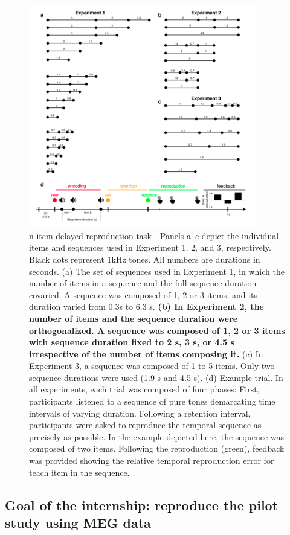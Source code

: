 \begin{figure}[ht]
    \centering
    \includegraphics[width=10cm]{images_report/n-item delayed reproduction task.png}
    \caption[n-item delayed reproduction task]%
    {n-item delayed reproduction task - Panels a–c depict the individual items and sequences used in Experiment 1, 2, and 3, respectively. Black dots represent 1kHz tones. All numbers are durations in seconds. (a) The set of sequences used in Experiment 1, in which the number of items in a sequence and the full sequence duration covaried. A sequence was composed of 1, 2 or 3 items, and its duration varied from 0.3s to 6.3 s. \textbf{(b) In Experiment 2, the number of items and the sequence duration were orthogonalized. A sequence was composed of 1, 2 or 3 items with sequence duration fixed to 2 s, 3 s, or 4.5 s irrespective of the number of items composing it.} (c) In Experiment 3, a sequence was composed of 1 to 5 items. Only two sequence durations were used (1.9 s and 4.5 s). (d) Example trial. In all experiments, each trial was composed of four phases: First, participants listened to a sequence of pure tones demarcating time intervals of varying duration. Following a retention interval, participants were asked to reproduce the temporal sequence as precisely as possible. In the example depicted here, the sequence was composed of two items. Following the reproduction (green), feedback was provided showing the relative temporal reproduction error for teach item in the sequence.}

    \label{paradigm}
\end{figure}


\subsection{Goal of the internship: reproduce the pilot study using MEG data}

